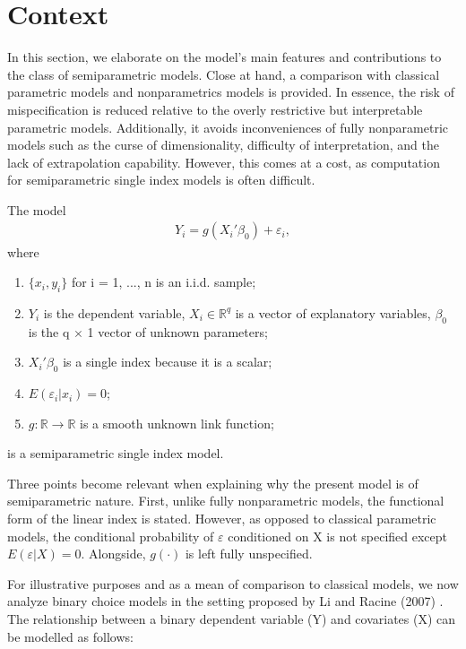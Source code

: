 \documentclass[a4paper]{article}
\begin{document}
\section{Context} %
\label{sec:context}
In this section, we elaborate on the model's main features and contributions to the class of semiparametric models. Close at hand, a comparison with classical parametric models and nonparametrics models is provided. In essence, the risk of mispecification is reduced relative to the overly restrictive but interpretable parametric models. Additionally, it avoids inconveniences of fully nonparametric models such as the curse of dimensionality, difficulty of interpretation, and the lack of extrapolation capability. However, this comes at a cost, as computation for semiparametric single index models is often difficult.

\vspace{2mm} 
The model
\begin{eqnarray}
Y_i = g(X_i'\beta_0) + \varepsilon_i,
\end{eqnarray}
where
\begin{enumerate}[label=(\roman*)]
		\item $\{x_i,y_i\}$ for i = 1, ..., n is an i.i.d. sample;
		\item $Y_{i}$ is the dependent variable, $X_i \in \mathbb{R}^{q}$ is a vector of explanatory variables, $\beta_0$ is the q $\times$ 1 vector of unknown parameters; 
	\item $X_i'\beta_0$ is a single index because it is a scalar;
	\item $ E(\varepsilon_i|x_i) = 0 $;
	\item $g: \mathbb{R} \rightarrow \mathbb{R} $ is a smooth unknown link function; 
\end{enumerate}
is a semiparametric single index model.
\vspace{2mm}

Three points become relevant when explaining why the present model is of  semiparametric nature. First, unlike fully nonparametric models, the functional form of the linear index is stated. However, as opposed to classical parametric models, the conditional probability of $\varepsilon$ conditioned on X is not specified except $ E(\varepsilon|X) = 0 $. Alongside, $g(\cdot)$ is left fully unspecified.

For illustrative purposes and as a mean of comparison to classical models, we now analyze binary choice models in the setting proposed by Li and Racine (2007) \cite{[1]}. The relationship between a binary dependent variable (Y) and covariates (X) can be modelled as follows:
\end{document}
